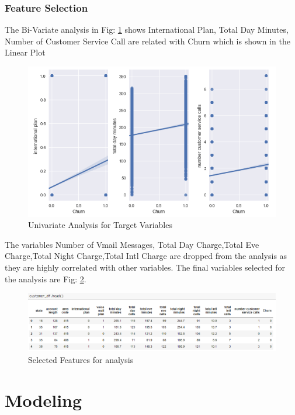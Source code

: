 \documentclass[a4paper,12pt]{report}
\begin{document}
\subsection{Feature Selection}
The Bi-Variate analysis in Fig: \ref{fig:2.3} shows International Plan, Total Day Minutes, Number of Customer Service Call are related with Churn which is shown in the Linear Plot  
\begin{figure}[h]
\vspace{-5pt}
\centering
\includegraphics[scale = 0.7]{target_plot.PNG}
\caption{Univariate Analysis for Target Variables}
\label{fig:2.3}
\end{figure}
\FloatBarrier
The variables Number of Vmail Messages, Total Day Charge,Total Eve Charge,Total Night Charge,Total Intl Charge are dropped from the analysis as they are highly correlated with other variables.
The final variables selected for the analysis are Fig: \ref{fig:2.4}.
\begin{figure}[h]
\vspace{-5pt}
\centering
\includegraphics[scale = 0.5]{all_vars.PNG}
\caption{Selected Features for analysis}
\label{fig:2.4}
\end{figure}
\FloatBarrier
\chapter{Modeling}
\end{document}
